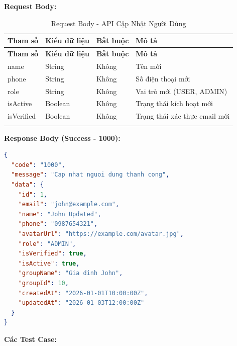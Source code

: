 \textbf{Request Body:}

\small
\begin{longtable}{|>{\raggedright\arraybackslash}p{3.5cm}|>{\raggedright\arraybackslash}p{2.5cm}|>{\raggedright\arraybackslash}p{2cm}|>{\raggedright\arraybackslash}p{5.5cm}|}
\hline
\textbf{Tham số} & \textbf{Kiểu dữ liệu} & \textbf{Bắt buộc} & \textbf{Mô tả} \\
\hline
\endfirsthead
\hline
\textbf{Tham số} & \textbf{Kiểu dữ liệu} & \textbf{Bắt buộc} & \textbf{Mô tả} \\
\hline
\endhead
name & String & Không & Tên mới \\
\hline
phone & String & Không & Số điện thoại mới \\
\hline
role & String & Không & Vai trò mới (USER, ADMIN) \\
\hline
isActive & Boolean & Không & Trạng thái kích hoạt mới \\
\hline
isVerified & Boolean & Không & Trạng thái xác thực email mới \\
\hline
\caption{Request Body - API Cập Nhật Người Dùng}
\end{longtable}

\textbf{Response Body (Success - 1000):}

\begin{lstlisting}[language=json, caption=Response thanh cong API 8.4]
{
  "code": "1000",
  "message": "Cap nhat nguoi dung thanh cong",
  "data": {
    "id": 1,
    "email": "john@example.com",
    "name": "John Updated",
    "phone": "0987654321",
    "avatarUrl": "https://example.com/avatar.jpg",
    "role": "ADMIN",
    "isVerified": true,
    "isActive": true,
    "groupName": "Gia dinh John",
    "groupId": 10,
    "createdAt": "2026-01-01T10:00:00Z",
    "updatedAt": "2026-01-03T12:00:00Z"
  }
}
\end{lstlisting}

\textbf{Các Test Case:}


